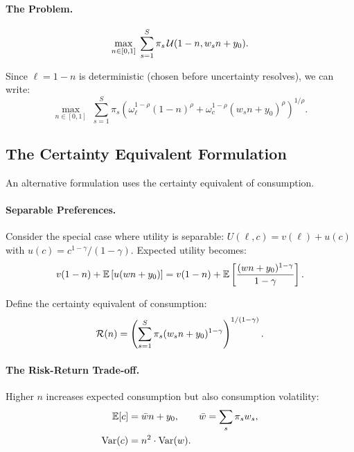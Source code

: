 \paragraph{The Problem.}
\begin{equation}
\max_{n \in [0,1]} \; \sum_{s=1}^{S} \pi_s \, \mathcal{U}(1 - n, w_s n + y_0).
\label{eq:labor-portfolio-problem}
\end{equation}

Since $\ell = 1 - n$ is deterministic (chosen before uncertainty resolves), we can write:
\begin{equation}
\max_{n \in [0,1]} \; \sum_{s=1}^{S} \pi_s \left( \omega_\ell^{1-\rho} (1-n)^\rho + \omega_c^{1-\rho} (w_s n + y_0)^\rho \right)^{1/\rho}.
\label{eq:labor-portfolio-expanded}
\end{equation}

\subsection{The Certainty Equivalent Formulation}
\label{subsec:certainty-equivalent}

An alternative formulation uses the certainty equivalent of consumption.

\paragraph{Separable Preferences.}
Consider the special case where utility is separable: $U(\ell, c) = v(\ell) + u(c)$ with $u(c) = c^{1-\gamma}/(1-\gamma)$. Expected utility becomes:
\begin{equation}
v(1 - n) + \mathbb{E}\left[ u(w n + y_0) \right] = v(1 - n) + \mathbb{E}\left[ \frac{(w n + y_0)^{1-\gamma}}{1-\gamma} \right].
\label{eq:separable-utility}
\end{equation}

Define the certainty equivalent of consumption:
\begin{equation}
\mathcal{R}(n) = \left( \sum_{s=1}^{S} \pi_s (w_s n + y_0)^{1-\gamma} \right)^{1/(1-\gamma)}.
\label{eq:ce-consumption}
\end{equation}

\paragraph{The Risk-Return Trade-off.}
Higher $n$ increases expected consumption but also consumption volatility:
\begin{align}
\mathbb{E}[c] &= \bar{w} n + y_0, \qquad \bar{w} = \sum_s \pi_s w_s, \\
\mathrm{Var}(c) &= n^2 \cdot \mathrm{Var}(w).
\end{align}

